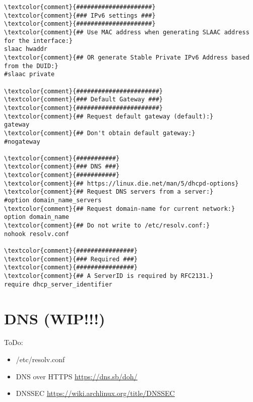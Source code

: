 \documentclass[10pt, a4paper, onecolumn, openany]{book} %
\begin{document}
\begin{enumerate}
\begin{Verbatim}[commandchars=\\\{\}]
\textcolor{comment}{#####################}
\textcolor{comment}{### IPv6 settings ###}
\textcolor{comment}{#####################}
\textcolor{comment}{## Use MAC address when generating SLAAC address for the interface:}
slaac hwaddr
\textcolor{comment}{## OR generate Stable Private IPv6 Address based from the DUID:}
#slaac private

\textcolor{comment}{#######################}
\textcolor{comment}{### Default Gateway ###}
\textcolor{comment}{#######################}
\textcolor{comment}{## Request default gateway (default):}
gateway
\textcolor{comment}{## Don't obtain default gateway:}
#nogateway

\textcolor{comment}{###########}
\textcolor{comment}{### DNS ###}
\textcolor{comment}{###########}
\textcolor{comment}{## https://linux.die.net/man/5/dhcpd-options}
\textcolor{comment}{## Request DNS servers from a server:}
#option domain_name_servers
\textcolor{comment}{## Request domain-name for current network:}
option domain_name
\textcolor{comment}{## Do not write to /etc/resolv.conf:}
nohook resolv.conf

\textcolor{comment}{################}
\textcolor{comment}{### Required ###}
\textcolor{comment}{################}
\textcolor{comment}{## A ServerID is required by RFC2131.}
require dhcp_server_identifier
\end{Verbatim} 
\end{enumerate}
\section{DNS (WIP!!!)}
ToDo:
\begin{itemize}
    \item /etc/resolv.conf
    \item DNS over HTTPS \underline{\href{https://dns.sb/doh/}{https://dns.sb/doh/}}
    \item DNSSEC \underline{\href{https://wiki.archlinux.org/title/DNSSEC}{https://wiki.archlinux.org/title/DNSSEC}}

\end{itemize}
\end{document}
